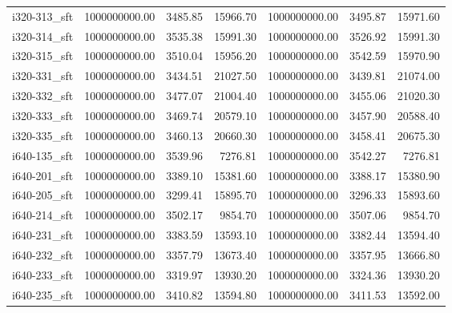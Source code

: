 \begin{tabular}{lrrrrrr}
i320-313\_sft &    1000000000.00 &              3485.85 &       15966.70 &    1000000000.00 &              3495.87 &       15971.60 \\
i320-314\_sft &    1000000000.00 &              3535.38 &       15991.30 &    1000000000.00 &              3526.92 &       15991.30 \\
i320-315\_sft &    1000000000.00 &              3510.04 &       15956.20 &    1000000000.00 &              3542.59 &       15970.90 \\
i320-331\_sft &    1000000000.00 &              3434.51 &       21027.50 &    1000000000.00 &              3439.81 &       21074.00 \\
i320-332\_sft &    1000000000.00 &              3477.07 &       21004.40 &    1000000000.00 &              3455.06 &       21020.30 \\
i320-333\_sft &    1000000000.00 &              3469.74 &       20579.10 &    1000000000.00 &              3457.90 &       20588.40 \\
i320-335\_sft &    1000000000.00 &              3460.13 &       20660.30 &    1000000000.00 &              3458.41 &       20675.30 \\
i640-135\_sft &    1000000000.00 &              3539.96 &        7276.81 &    1000000000.00 &              3542.27 &        7276.81 \\
i640-201\_sft &    1000000000.00 &              3389.10 &       15381.60 &    1000000000.00 &              3388.17 &       15380.90 \\
i640-205\_sft &    1000000000.00 &              3299.41 &       15895.70 &    1000000000.00 &              3296.33 &       15893.60 \\
i640-214\_sft &    1000000000.00 &              3502.17 &        9854.70 &    1000000000.00 &              3507.06 &        9854.70 \\
i640-231\_sft &    1000000000.00 &              3383.59 &       13593.10 &    1000000000.00 &              3382.44 &       13594.40 \\
i640-232\_sft &    1000000000.00 &              3357.79 &       13673.40 &    1000000000.00 &              3357.95 &       13666.80 \\
i640-233\_sft &    1000000000.00 &              3319.97 &       13930.20 &    1000000000.00 &              3324.36 &       13930.20 \\
i640-235\_sft &    1000000000.00 &              3410.82 &       13594.80 &    1000000000.00 &              3411.53 &       13592.00 \\
\bottomrule
\end{tabular}
